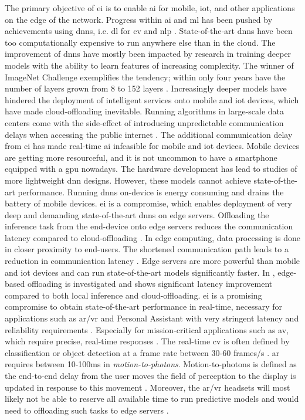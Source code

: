 The primary objective of \gls{ei} is to enable \gls{ai} for mobile, \gls{iot}, and other applications on the edge of the network. Progress within \gls{ai} and \gls{ml} has been pushed by achievements using \gls{dnn}s, i.e. \gls{dl} for \acrfull{cv} and \gls{nlp} \cite{stoica_berkeley_2017}. State-of-the-art \gls{dnn}s have been too computationally expensive to run anywhere else \cite{zhou_edge_2019} than in the cloud. The improvement of \gls{dnn}s have mostly been impacted by research in training deeper models with the ability to learn features of increasing complexity. The winner of ImageNet Challenge exemplifies the tendency; within only four years have the number of layers grown from 8 to 152 layers \cite{russakovsky_imagenet_2015}. Increasingly deeper models have hindered the deployment of intelligent services onto mobile and \gls{iot} devices, which have made cloud-offloading inevitable. Running algorithms in large-scale data centers come with the side-effect of introducing unpredictable communication delays when accessing the public internet \cite{shi_edge_2016}. The additional communication delay from \gls{ci} has made real-time \gls{ai} infeasible for mobile and \gls{iot} devices. Mobile devices are getting more resourceful, and it is not uncommon to have a smartphone equipped with a \gls{gpu} nowadays. The hardware development has lead to studies of more lightweight \gls{dnn} designs. However, these models cannot achieve state-of-the-art performance. Running \gls{dnn}s on-device is energy consuming and drains the battery of mobile devices.
\gls{ei} is a compromise, which enables deployment of very deep and demanding state-of-the-art \gls{dnn}s on edge servers. Offloading the inference task from the end-device onto edge servers reduces the communication latency compared to cloud-offloading \cite{zhou_edge_2019}. In edge computing, data processing is done in closer proximity to end-users. The shortened communication path leads to a reduction in communication latency \cite{shi_edge_2016}. Edge servers are more powerful than mobile and \gls{iot} devices and can run state-of-the-art models significantly faster. In \cite{karlsen_prototyping_nodate}, edge-based offloading is investigated and shows significant latency improvement compared to both local inference and cloud-offloading. \gls{ei} is a promising compromise to obtain state-of-the-art performance in real-time, necessary for applications such as \gls{ar}/\gls{vr} and Personal Assistant with very stringent latency and reliability requirements \cite{zhou_edge_2019}. Especially for mission-critical applications such as \gls{av}, which require precise, real-time responses \cite{stoica_berkeley_2017}. The real-time \gls{cv} is often defined by classification or object detection at a frame rate between 30-60 frames/s \cite{chen_deep_2019}. \gls{ar} requires between 10-100ms in \emph{motion-to-photons}\cite{chen_deep_2019}. Motion-to-photons is defined as the end-to-end delay from the user moves the field of perception to the display is updated in response to this movement \cite{lavalle_virtual_2019}. Moreover, the \gls{ar}/\gls{vr} headsets will most likely not be able to reserve all available time to run predictive models and would need to offloading such tasks to edge servers \cite{chen_deep_2019}.

